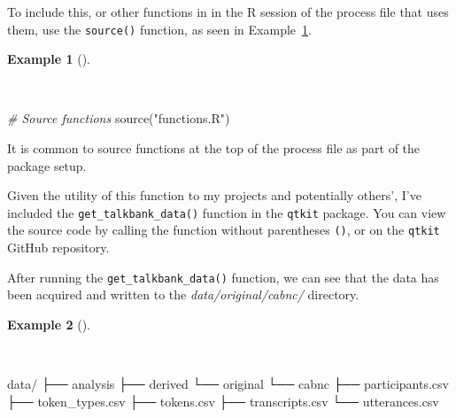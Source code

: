 \documentclass[
  letterpaper,
]{latex/krantz}
\newenvironment{Shaded}{\begin{snugshade}}{\end{snugshade}}
\newcommand{\CommentTok}[1]{\textcolor[rgb]{0.00,0.00,0.00}{\textit{#1}}}
\newcommand{\ExtensionTok}[1]{\textcolor[rgb]{0.00,0.00,0.00}{#1}}
\newcommand{\FunctionTok}[1]{\textcolor[rgb]{0.00,0.00,0.00}{#1}}
\newcommand{\NormalTok}[1]{\textcolor[rgb]{0.00,0.00,0.00}{#1}}
\newcommand{\StringTok}[1]{\textcolor[rgb]{0.00,0.00,0.00}{#1}}
\theoremstyle{definition}
\newtheorem{example}{Example}[chapter]
\theoremstyle{remark}
\begin{document}
To include this, or other functions in in the R session of the process
file that uses them, use the \texttt{source()} function, as seen in
Example~\ref{exm-ad-source-functions}.

\begin{example}[]\protect\hypertarget{exm-ad-source-functions}{}\label{exm-ad-source-functions}

~

\begin{Shaded}
\begin{Highlighting}[]
\CommentTok{\# Source functions}
\FunctionTok{source}\NormalTok{(}\StringTok{"functions.R"}\NormalTok{)}
\end{Highlighting}
\end{Shaded}

\end{example}

It is common to source functions at the top of the process file as part
of the package setup.

Given the utility of this function to my projects and potentially
others', I've included the \texttt{get\_talkbank\_data()} function in
the \texttt{qtkit} package. You can view the source code by calling the
function without parentheses \texttt{()}, or on the \texttt{qtkit}
GitHub repository.

After running the \texttt{get\_talkbank\_data()} function, we can see
that the data has been acquired and written to the
\emph{data/original/cabnc/} directory.

\begin{example}[]\protect\hypertarget{exm-ad-functions-r}{}\label{exm-ad-functions-r}

~

\begin{Shaded}
\begin{Highlighting}[]
\ExtensionTok{data/}
\ExtensionTok{├──}\NormalTok{ analysis}
\ExtensionTok{├──}\NormalTok{ derived}
\ExtensionTok{└──}\NormalTok{ original}
    \ExtensionTok{└──}\NormalTok{ cabnc}
        \ExtensionTok{├──}\NormalTok{ participants.csv}
        \ExtensionTok{├──}\NormalTok{ token\_types.csv}
        \ExtensionTok{├──}\NormalTok{ tokens.csv}
        \ExtensionTok{├──}\NormalTok{ transcripts.csv}
        \ExtensionTok{└──}\NormalTok{ utterances.csv}
\end{Highlighting}
\end{Shaded}

\end{example}
\end{document}
